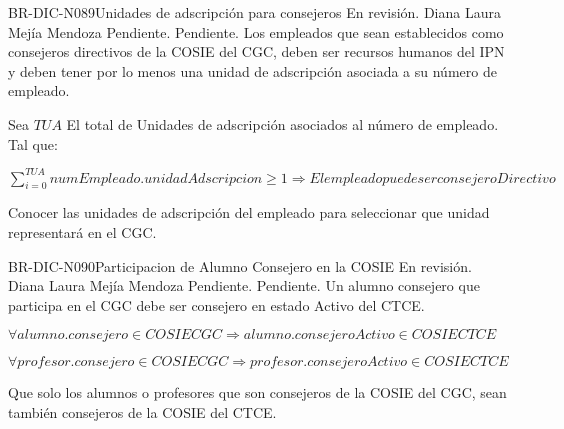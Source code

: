 \begin{BusinessRule}{BR-DIC-N089}{Unidades de adscripción para consejeros}
	{\bcAutorization} %
	{\btTimer}     %
	{\blInfluencing}     %
	\BRItem[Estado] En revisión.
	 Diana Laura Mejía Mendoza
	 Pendiente.
	 Pendiente.
	\BRItem[Descripción] Los empleados que sean establecidos como consejeros directivos de la COSIE del CGC, deben ser recursos humanos del IPN y deben tener por lo menos una unidad de adscripción asociada a su número de empleado.
	\BRItem[Sentencia] \cdtEmpty
	
	Sea $ TUA$ El total de Unidades de adscripción asociados al número de empleado.\\
	
	Tal que:
	\begin{center}
	$\sum_{i=0}^{TUA} numEmpleado.unidadAdscripcion \geq 1  \Rightarrow El empleado puede ser consejero Directivo$
	\end{center}
	
	\BRItem[Motivación] Conocer las unidades de adscripción del empleado para seleccionar que unidad representará en el CGC.
\end{BusinessRule}
\begin{BusinessRule}{BR-DIC-N090}{Participacion de Alumno Consejero en la COSIE}
	{\bcCondition} %
	{\btEnabler}     %
	{\blControlling}     %
	\BRItem[Estado] En revisión.
	 Diana Laura Mejía Mendoza
	 Pendiente.
	 Pendiente.
	\BRItem[Descripción] Un alumno consejero que participa en el CGC debe ser consejero en estado Activo del CTCE.
	\BRItem[Sentencia] \cdtEmpty
	
	\begin{center}
	$\forall alumno.consejero \in COSIECGC \Rightarrow alumno.consejeroActivo \in COSIECTCE $
	\end{center}
	
	\begin{center}
	$\forall profesor.consejero \in COSIECGC \Rightarrow profesor.consejeroActivo \in COSIECTCE $
	\end{center}
%	
	\BRItem[Motivación] Que solo los alumnos o profesores que son consejeros de la COSIE del CGC, sean también consejeros de la COSIE del CTCE.
\end{BusinessRule}

